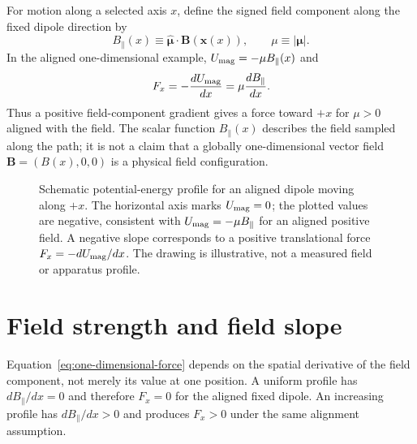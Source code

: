 \documentclass[12pt]{article}
\begin{document}
For motion along a selected axis $x$, define the signed field component along the fixed dipole direction by
\begin{equation}
  B_{\parallel}(x)
  \equiv\widehat{\boldsymbol{\mu}}\cdot\mathbf B(\mathbf x(x)),
  \qquad
  \mu\equiv|\boldsymbol{\mu}|.
  \label{eq:parallel-field}
\end{equation}
In the aligned one-dimensional example, $U_{\rm mag}=-\mu B_{\parallel}(x)$ and
\begin{equation}
  F_x=-\frac{dU_{\rm mag}}{dx}
     =\mu\frac{dB_{\parallel}}{dx}.
  \label{eq:one-dimensional-force}
\end{equation}
Thus a positive field-component gradient gives a force toward $+x$ for $\mu>0$ aligned with the field. The scalar function $B_{\parallel}(x)$ describes the field sampled along the path; it is not a claim that a globally one-dimensional vector field $\mathbf B=(B(x),0,0)$ is a physical field configuration.

\begin{figure}[ht]
  \centering
  \caption{Schematic potential-energy profile for an aligned dipole moving along $+x$. The horizontal axis marks $U_{\rm mag}=0$; the plotted values are negative, consistent with $U_{\rm mag}=-\mu B_{\parallel}$ for an aligned positive field. A negative slope corresponds to a positive translational force $F_x=-dU_{\rm mag}/dx$. The drawing is illustrative, not a measured field or apparatus profile.}
  \label{fig:potential-slope}
\end{figure}

\section{Field strength and field slope}
\label{sec:field-slope}

Equation~\eqref{eq:one-dimensional-force} depends on the spatial derivative of the field component, not merely its value at one position. A uniform profile has $dB_{\parallel}/dx=0$ and therefore $F_x=0$ for the aligned fixed dipole. An increasing profile has $dB_{\parallel}/dx>0$ and produces $F_x>0$ under the same alignment assumption.
\end{document}
